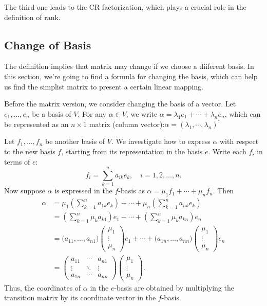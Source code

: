 The third one leads to the CR factorization, which plays a crucial role in the definition of rank.

\subsection{Change of Basis}
The definition implies that matrix may change if we choose a diiferent basis. In this section, we're going to find a formula for changing the basis, which can help us find the simplist matrix to present a certain linear mapping.

Before the matrix version, we consider changing the basis of a vector.
Let $e_1, \dots, e_n$ be a basis of $V$. For any $\alpha \in V$, we write $\alpha = \lambda_1 e_1 + \cdots + \lambda_n e_n$, which can be represented as an $n \times 1$ matrix (column vector):$\alpha = (\lambda_1, \cdots, \lambda_n )^{\prime}$

Let $f_1, \dots, f_n$ be another basis of $V$. We investigate how to express $\alpha$ with respect to the new basis $f$, starting from its representation in the basis $e$. Write each $f_i$ in terms of $e$:
$$f_i = \sum_{k=1}^{n} a_{ik} e_k, \quad i = 1, 2, \dots, n.$$
Now suppose $\alpha$ is expressed in the $f$-basis as $\alpha = \mu_1 f_1 + \cdots + \mu_n f_n$. Then
\begin{align*}
\alpha &= \mu_1 \left( \sum_{k=1}^{n} a_{1k} e_k \right) + \cdots + \mu_n \left( \sum_{k=1}^{n} a_{nk} e_k \right) \\
&= \left( \sum_{k=1}^{n} \mu_k a_{k1} \right) e_1 + \cdots + \left( \sum_{k=1}^{n} \mu_k a_{kn} \right) e_n \\
&= \bigl( a_{11}, \dots, a_{n1} \bigr) \begin{pmatrix} \mu_1 \\ \vdots \\ \mu_n \end{pmatrix} e_1
      + \cdots + \bigl( a_{1n}, \dots, a_{nn} \bigr) \begin{pmatrix} \mu_1 \\ \vdots \\ \mu_n \end{pmatrix} e_n \\
&= \begin{pmatrix}
    a_{11} & \cdots & a_{n1} \\
    \vdots & \ddots & \vdots \\
    a_{1n} & \cdots & a_{nn}
   \end{pmatrix}
   \begin{pmatrix}
    \mu_1 \\
    \vdots \\
    \mu_n
   \end{pmatrix}.
\end{align*}
Thus, the coordinates of $\alpha$ in the $e$-basis are obtained by multiplying the transition matrix by its coordinate vector in the $f$-basis.
